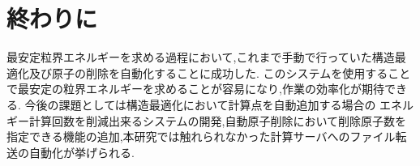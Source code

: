\chapter{終わりに}\label{ux7d42ux308fux308aux306b}

最安定粒界エネルギーを求める過程において,これまで手動で行っていた構造最適化及び原子の削除を自動化することに成功した.
このシステムを使用することで最安定の粒界エネルギーを求めることが容易になり,作業の効率化が期待できる.
今後の課題としては構造最適化において計算点を自動追加する場合の
    エネルギー計算回数を削減出来るシステムの開発,自動原子削除において削除原子数を指定できる機能の追加,本研究では触れられなかった計算サーバへのファイル転送の自動化が挙げられる.